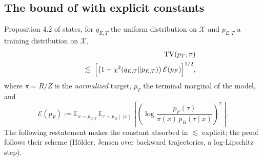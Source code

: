 \subsection{The bound of \citet{silvageneralization} with explicit constants}

Proposition 4.2 of \citet{silvageneralization} states, for $q_{E,T}$ the uniform distribution on $\mathcal X$ and $p_{E,T}$ a training distribution on $\mathcal X$,
\begin{eqnarray}
&&\mathrm{TV}(p_T,\pi) \nonumber \\ && \quad \lesssim\;
\Bigl[\bigl(1+\chi^2(q_{E,T}\|p_{E,T})\bigr) \, \mathcal E(p_F)\Bigr]^{1/2},
\label{eq:silva_bound}
\end{eqnarray}
where $\pi = R/Z$ is the \emph{normalized} target, $p_T$ the terminal marginal of the model, and
\begin{equation}
\mathcal E(p_F) := \mathbb E_{x\sim p_{E,T}}\,\mathbb E_{\tau\sim p_B(\cdot|x)}\left[\left(\log \frac{p_F(\tau)}{\pi(x)\,p_B(\tau\mid x)}\right)^{\!2}\right].
\end{equation}
The following restatement makes the constant absorbed in $\lesssim$ explicit; the proof follows their scheme (H\"older, Jensen over backward trajectories, a log-Lipschitz step).

